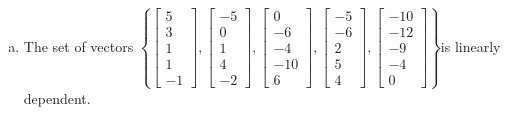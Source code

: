 \begin{exerciseAnswer}
\begin{enumerate}[(a)]
\item  The set of vectors \( \left\{ \left[\begin{array}{c}
5 \\
3 \\
1 \\
1 \\
-1
\end{array}\right] , \left[\begin{array}{c}
-5 \\
0 \\
1 \\
4 \\
-2
\end{array}\right] , \left[\begin{array}{c}
0 \\
-6 \\
-4 \\
-10 \\
6
\end{array}\right] , \left[\begin{array}{c}
-5 \\
-6 \\
2 \\
5 \\
4
\end{array}\right] , \left[\begin{array}{c}
-10 \\
-12 \\
-9 \\
-4 \\
0
\end{array}\right] \right\} \)is linearly dependent.
\end{enumerate}
    
\end{exerciseAnswer}
    
